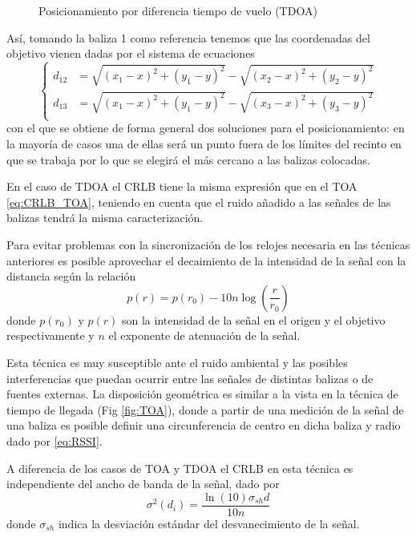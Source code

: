 \begin{figure}[H]
    \centering
    \def\svgwidth{0.6\linewidth}
	
	\caption{Posicionamiento por diferencia tiempo de vuelo (TDOA)}
\end{figure}
Así, tomando la baliza 1 como referencia tenemos que las coordenadas del objetivo vienen dadas por el sistema de ecuaciones
\begin{equation}
    \begin{cases}
        d_{12} &= \sqrt{(x_1 - x)^2 + (y_1 - y)^2} - \sqrt{(x_2 - x)^2 + (y_2 - y)^2} \\
        d_{13} &= \sqrt{(x_1 - x)^2 + (y_1 - y)^2} - \sqrt{(x_3 - x)^2 + (y_3 - y)^2} \\
    \end{cases}
\end{equation}
con el que se obtiene de forma general dos soluciones para el posicionamiento: en la mayoría de casos una de ellas será un punto fuera de los límites del recinto en que se trabaja por lo que se elegirá el más cercano a las balizas colocadas.

En el caso de TDOA el CRLB tiene la misma expresión que en el TOA \eqref{eq:CRLB_TOA}, teniendo en cuenta que el ruido añadido a las señales de las balizas tendrá la misma caracterización.


Para evitar problemas con la sincronización de los relojes necesaria en las técnicas anteriores es posible aprovechar el decaimiento de la intensidad de la señal con la distancia según la relación
\begin{equation}\label{eq:RSSI}
    p(r) = p(r_0) - 10n\log(\frac{r}{r_0})
\end{equation}
donde $p(r_0)$ y $p(r)$ son la intensidad de la señal en el origen y el objetivo respectivamente y $n$ el exponente de atenuación de la señal.

Esta técnica es muy susceptible ante el ruido ambiental y las posibles interferencias que puedan ocurrir entre las señales de distintas balizas o de fuentes externas.
La disposición geométrica es similar a la vista en la técnica de tiempo de llegada (Fig \ref{fig:TOA}), donde a partir de una medición de la señal de una baliza es posible definir una circunferencia de centro en dicha baliza y radio dado por \eqref{eq:RSSI}.

A diferencia de los casos de TOA y TDOA el CRLB en esta técnica es independiente del ancho de banda de la señal, dado por \cite{MAIN}
\begin{equation}\label{eq:CRLB_RSSI}
    \sigma^2(d_i) = \frac{\ln(10)\sigma_{sh}d}{10n}
\end{equation}
donde $\sigma_{sh}$ indica la desviación estándar del desvanecimiento de la señal.

